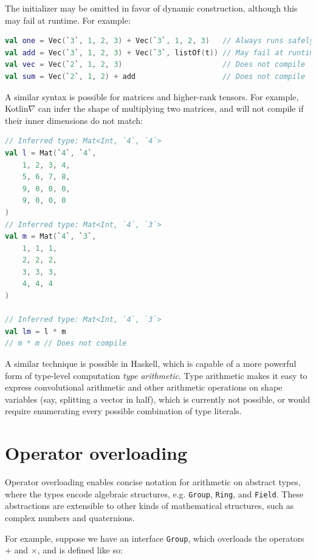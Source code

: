 \documentclass[12pt,initial,twoside,maitrise]{dms}
\numberwithin{equation}{section}
\numberwithin{table}{chapter}
\numberwithin{figure}{chapter}
\begin{document}
The initializer may be omitted in favor of dynamic construction, although this may fail at runtime. For example:

\begin{lstlisting}[language=Kotlin]
val one = Vec(`3`, 1, 2, 3) + Vec(`3`, 1, 2, 3)   // Always runs safely
val add = Vec(`3`, 1, 2, 3) + Vec(`3`, listOf(t)) // May fail at runtime
val vec = Vec(`2`, 1, 2, 3)                       // Does not compile
val sum = Vec(`2`, 1, 2) + add                    // Does not compile
\end{lstlisting}

A similar syntax is possible for matrices and higher-rank tensors. For example, Kotlin$\nabla$ can infer the shape of multiplying two matrices, and will not compile if their inner dimensions do not match:

\begin{lstlisting}[language=Kotlin]
// Inferred type: Mat<Int, `4`, `4`>
val l = Mat(`4`, `4`,
    1, 2, 3, 4,
    5, 6, 7, 8,
    9, 0, 0, 0,
    9, 0, 0, 0
)
// Inferred type: Mat<Int, `4`, `3`>
val m = Mat(`4`, `3`,
    1, 1, 1,
    2, 2, 2,
    3, 3, 3,
    4, 4, 4
)

// Inferred type: Mat<Int, `4`, `3`>
val lm = l * m
// m * m // Does not compile
\end{lstlisting}

A similar technique is possible in Haskell, which is capable of a more powerful form of type-level computation \textit{type arithmetic}. Type arithmetic makes it easy to express convolutional arithmetic and other arithmetic operations on shape variables (say, splitting a vector in half), which is currently not possible, or would require enumerating every possible combination of type literals.

\section{Operator overloading}\label{sec:operator-overloading}

Operator overloading enables concise notation for arithmetic on abstract types, where the types encode algebraic structures, e.g. \texttt{Group}, \texttt{Ring}, and \texttt{Field}. These abstractions are extensible to other kinds of mathematical structures, such as complex numbers and quaternions.

For example, suppose we have an interface \texttt{Group}, which overloads the operators $+$ and $\times$, and is defined like so:
\end{document}
